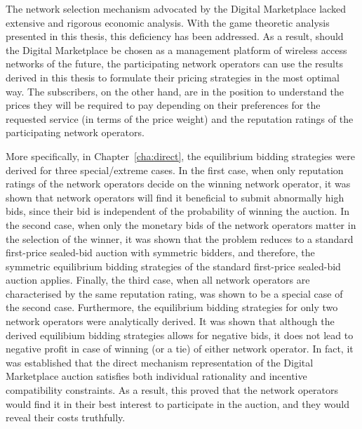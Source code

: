 The network selection mechanism advocated by the Digital Marketplace lacked extensive and rigorous economic analysis. With the game theoretic analysis presented in this thesis, this deficiency has been addressed. As a result, should the Digital Marketplace be chosen as a management platform of wireless access networks of the future, the participating network operators can use the results derived in this thesis to formulate their pricing strategies in the most optimal way. The subscribers, on the other hand, are in the position to understand the prices they will be required to pay depending on their preferences for the requested service (in terms of the price weight) and the reputation ratings of the participating network operators.

More specifically, in Chapter~\ref{cha:direct}, the equilibrium bidding strategies were derived for three special/extreme cases. In the first case, when only reputation ratings of the network operators decide on the winning network operator, it was shown that network operators will find it beneficial to submit abnormally high bids, since their bid is independent of the probability of winning the auction. In the second case, when only the monetary bids of the network operators matter in the selection of the winner, it was shown that the problem reduces to a standard first-price sealed-bid auction with symmetric bidders, and therefore, the symmetric equilibrium bidding strategies of the standard first-price sealed-bid auction applies. Finally, the third case, when all network operators are characterised by the same reputation rating, was shown to be a special case of the second case. Furthermore, the equilibrium bidding strategies for only two network operators were analytically derived. It was shown that although the derived equilibium bidding strategies allows for negative bids, it does not lead to negative profit in case of winning (or a tie) of either network operator. In fact, it was established that the direct mechanism representation of the Digital Marketplace auction satisfies both individual rationality and incentive compatibility constraints. As a result, this proved that the network operators would find it in their best interest to participate in the auction, and they would reveal their costs truthfully.

